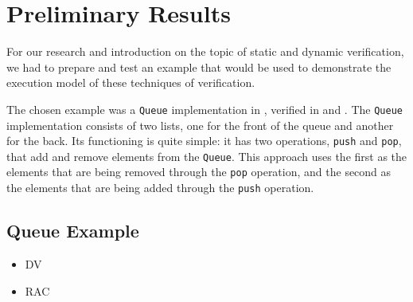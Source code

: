 
%

\chapter{Preliminary Results}
\label{cha:preliminary_results}

For our research and introduction on the topic of static and dynamic verification, 
we had to prepare and test an example that would be used to demonstrate the 
execution model of these techniques of verification. 

The chosen example was a \texttt{Queue} implementation in \ocaml, 
verified in \why and \gospellang. The \texttt{Queue} implementation 
consists of two lists, one for the front of the queue and another for 
the back. Its functioning is quite simple: it has two operations, 
\texttt{push} and \texttt{pop}, that add and remove elements from the \texttt{Queue}. 
This approach uses the first  as the elements that are 
being removed through the \texttt{pop} operation, and the second  
as the elements that are being added through the \texttt{push} operation.

\section{Queue Example}
\label{sec:queue_example}


\begin{itemize}
    \item DV
    \item RAC
\end{itemize}